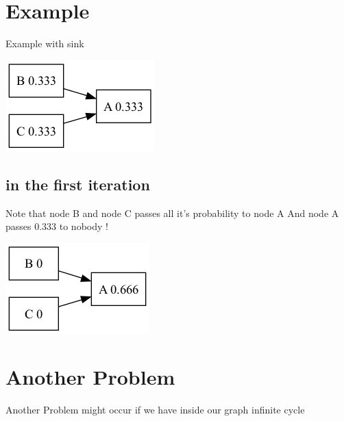 \documentclass[11pt]{article}
\begin{document}
\section*{Example}
\label{sec:orgb5d7f76}
Example with sink
\begin{center}
\includegraphics[width=.9\linewidth]{sink_problem1.png}
\end{center}


\subsection*{in the first iteration}
\label{sec:org8bc586f}
Note that node B and node C passes all it's probability to node A
And node A passes 0.333 to nobody !
\begin{center}
\includegraphics[width=.9\linewidth]{sink_problem2.png}
\end{center}

\section*{Another Problem}
\label{sec:org274a42f}
Another Problem might occur if we have inside our graph infinite cycle
\end{document}
